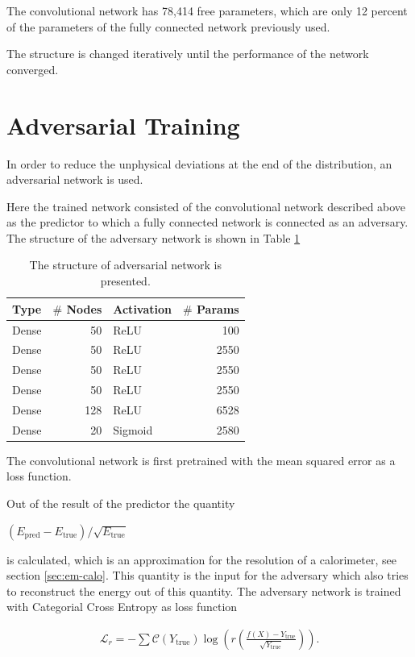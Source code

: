 \documentclass[12pt, a4paper]{thesis}
\begin{document}
The convolutional network has 78,414 free parameters, which are only
12 percent of the parameters of the fully connected network previously
used.

The structure is changed iteratively until the performance of the
network converged.

\clearpage
\section{Adversarial Training}
\label{sec:org30a0273}

In order to reduce the unphysical deviations at the end of the
distribution, an adversarial network is used.

Here the trained network consisted of the convolutional network
  described above as the predictor to which a fully connected network
  is connected as an adversary. The structure of the adversary network
  is shown in Table \ref{adv_structure}

\begin{table}[htbp]
  \centering
  \begin{tabular}{lrlr}
    Type & \(\#\) Nodes & Activation & \(\#\) Params\\
    \hline
    Dense & 50 & ReLU & 100\\
    Dense & 50 & ReLU & 2550\\
    Dense & 50 & ReLU & 2550\\
    Dense & 50 & ReLU & 2550\\
    Dense & 128& ReLU & 6528\\
    Dense & 20 & Sigmoid & 2580\\ 
  \end{tabular}
  \caption{The structure of adversarial network is presented.}
  \label{adv_structure}
\end{table}


The convolutional network is first pretrained with the mean squared
error as a loss function.

Out of the result of the predictor the quantity

\((E_{\text{pred}}-E_{\text{true}})/\sqrt{E_{\text{true}}}\)

is calculated, which is an approximation for the resolution of a
calorimeter, see section \ref{sec:em-calo}. This quantity is the input
for the adversary which also tries to reconstruct the energy out of
this quantity. The adversary network is trained with Categorial Cross
Entropy as loss function

\begin{align}
\mathcal{L}_r = - \sum \mathcal{C}\left(Y_{\text{true}}\right)
\log(r\left(\frac{f(X)-Y_{\text{true}}}{\sqrt{Y_{\text{true}}}}\right)).
\end{align}
\end{document}
